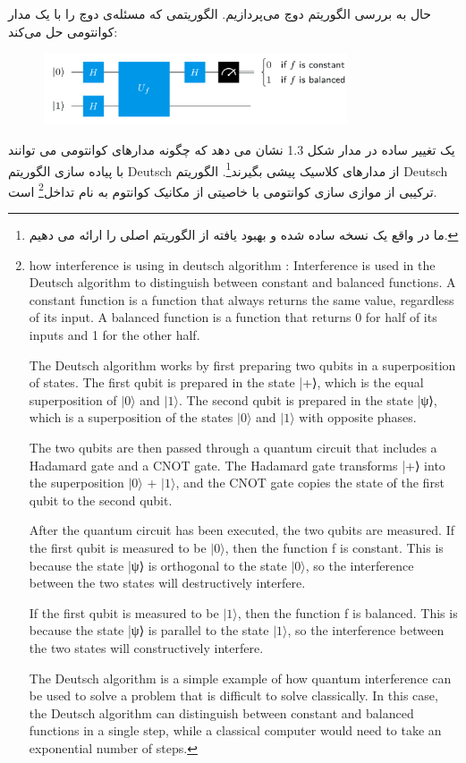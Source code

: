 \documentclass{book}
\begin{document}
حال به بررسی الگوریتم دوچ می‌پردازیم. الگوریتمی که مسئله‌ی دوچ را با یک مدار کوانتومی حل می‌کند:\\
\begin{center}
\begin{figure}[ht]
	\centering
	\includegraphics[width=0.8\textwidth]{Deutsch algorithm.png}
	\caption{}
\end{figure}
\end{center}


یک تغییر ساده در مدار شکل 1.3 نشان می دهد که چگونه مدارهای کوانتومی می توانند با پیاده سازی الگوریتم Deutsch از مدارهای کلاسیک پیشی بگیرند\footnote{ما در واقع یک نسخه ساده شده و بهبود یافته از الگوریتم اصلی را ارائه می دهیم.}. الگوریتم Deutsch ترکیبی از موازی سازی کوانتومی با خاصیتی از مکانیک کوانتوم به نام تداخل\footnote{how interference is using in deutsch algorithm : Interference is used in the Deutsch algorithm to distinguish between constant and balanced functions. A constant function is a function that always returns the same value, regardless of its input. A balanced function is a function that returns 0 for half of its inputs and 1 for the other half.
	
	The Deutsch algorithm works by first preparing two qubits in a superposition of states. The first qubit is prepared in the state |+⟩, which is the equal superposition of $\vert 0 \rangle$ and $\vert 1 \rangle$. The second qubit is prepared in the state |ψ⟩, which is a superposition of the states $\vert 0 \rangle$ and $\vert 1 \rangle$ with opposite phases.
	
	The two qubits are then passed through a quantum circuit that includes a Hadamard gate and a CNOT gate. The Hadamard gate transforms |+⟩ into the superposition $\vert 0 \rangle$ + $\vert 1 \rangle$, and the CNOT gate copies the state of the first qubit to the second qubit.
	
	After the quantum circuit has been executed, the two qubits are measured. If the first qubit is measured to be $\vert 0 \rangle$, then the function f is constant. This is because the state |ψ⟩ is orthogonal to the state $\vert 0 \rangle$, so the interference between the two states will destructively interfere.
	
	If the first qubit is measured to be $\vert 1 \rangle$, then the function f is balanced. This is because the state |ψ⟩ is parallel to the state $\vert 1 \rangle$, so the interference between the two states will constructively interfere.
	
	The Deutsch algorithm is a simple example of how quantum interference can be used to solve a problem that is difficult to solve classically. In this case, the Deutsch algorithm can distinguish between constant and balanced functions in a single step, while a classical computer would need to take an exponential number of steps.} است.
\end{document}
